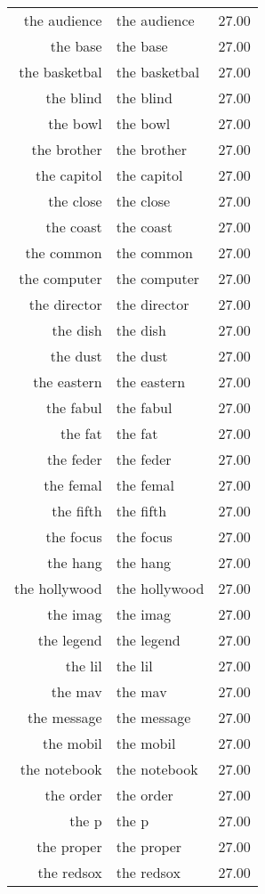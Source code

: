 \begin{table}[ht]
\begin{tabular}{rlr}
  the audience & the audience & 27.00 \\ 
  the base & the base & 27.00 \\ 
  the basketbal & the basketbal & 27.00 \\ 
  the blind & the blind & 27.00 \\ 
  the bowl & the bowl & 27.00 \\ 
  the brother & the brother & 27.00 \\ 
  the capitol & the capitol & 27.00 \\ 
  the close & the close & 27.00 \\ 
  the coast & the coast & 27.00 \\ 
  the common & the common & 27.00 \\ 
  the computer & the computer & 27.00 \\ 
  the director & the director & 27.00 \\ 
  the dish & the dish & 27.00 \\ 
  the dust & the dust & 27.00 \\ 
  the eastern & the eastern & 27.00 \\ 
  the fabul & the fabul & 27.00 \\ 
  the fat & the fat & 27.00 \\ 
  the feder & the feder & 27.00 \\ 
  the femal & the femal & 27.00 \\ 
  the fifth & the fifth & 27.00 \\ 
  the focus & the focus & 27.00 \\ 
  the hang & the hang & 27.00 \\ 
  the hollywood & the hollywood & 27.00 \\ 
  the imag & the imag & 27.00 \\ 
  the legend & the legend & 27.00 \\ 
  the lil & the lil & 27.00 \\ 
  the mav & the mav & 27.00 \\ 
  the message & the message & 27.00 \\ 
  the mobil & the mobil & 27.00 \\ 
  the notebook & the notebook & 27.00 \\ 
  the order & the order & 27.00 \\ 
  the p & the p & 27.00 \\ 
  the proper & the proper & 27.00 \\ 
  the redsox & the redsox & 27.00 \\ 

\end{tabular}
\end{table}
